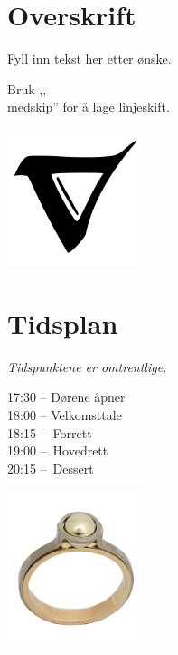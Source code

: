 \documentclass{article}
\begin{document}
\pagestyle{empty}

\begin{landscape}
\begin{multicols}{3}

\begin{center}

\normalsize


\section*{Overskrift}
Fyll inn tekst her etter ønske.

\medskip
Bruk ,,\\medskip'' for å lage linjeskift.

\begin{center}
\includegraphics[width=0.3\textwidth]{bilder/nabla.jpg}
\end{center}

\columnbreak
\section*{Tidsplan}
\emph{Tidspunktene er omtrentlige.}

17:30 – Dørene åpner \\
18:00 – Velkomsttale \\
18:15 – Forrett \\
19:00 – Hovedrett \\
20:15 – Dessert \\

\begin{center}
\includegraphics[width=0.3\textwidth]{bilder/siving.png}
\end{center}


\end{center}
\end{multicols}
\end{landscape}
\end{document}
